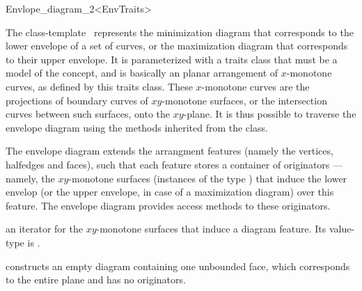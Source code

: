 
\ccRefPageBegin

\begin{ccRefClass}{Envlope_diagram_2<EnvTraits>}

\ccDefinition

The class-template \ccClassTemplateName\ represents the minimization
diagram that corresponds to the lower envelope of a set of curves, or the
maximization diagram that corresponds to their upper envelope. It is
parameterized with a traits class that must be a model of the
 concept, and is basically an planar arrangement of
$x$-monotone curves, as defined by this traits class. These $x$-monotone
curves are the projections of boundary curves of $xy$-monotone surfaces,
or the intersection curves between such surfaces, onto the $xy$-plane.
It is thus possible to traverse the envelope diagram using the
methods inherited from the  class.

The envelope diagram extends the arrangment features (namely the vertices,
halfedges and faces), such that each feature stores a container of
originators --- namely, the $xy$-monotone surfaces (instances of the type
) that induce the lower envelop
(or the upper envelope, in case of a maximization diagram) over this
feature. The envelope diagram provides access methods to these originators.

 
\ccInheritsFrom

\ccTypes

\ccGlue
{}

{an iterator for the $xy$-monotone surfaces that induce a diagram feature.
 Its value-type is .}

\ccCreation
{}

    {constructs an empty diagram containing one unbounded face,
     which corresponds to the entire plane and has no originators.}
    

\end{ccRefClass}
